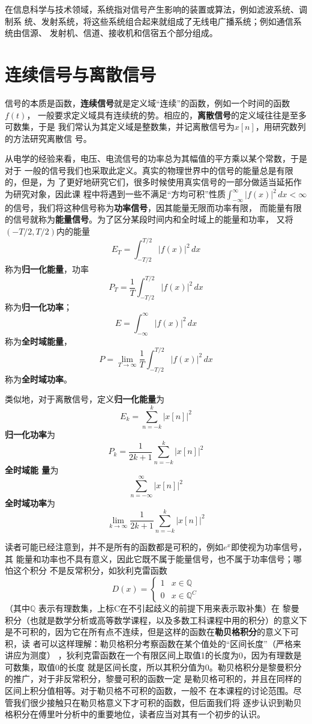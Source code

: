 \documentclass{ctexbook}
\begin{document}
在信息科学与技术领域，系统指对信号产生影响的装置或算法，例如滤波系统、调制系
统、发射系统，将这些系统组合起来就组成了无线电广播系统；例如通信系统由信源、
发射机、信道、接收机和信宿五个部分组成。

\section{连续信号与离散信号}\label{sec:signal}
信号的本质是函数，\textbf{连续信号}就是定义域“连续”的函数，例如一个时间的函数$f(t)$，
一般要求定义域具有连续统的势。相应的，\textbf{离散信号}的定义域往往是至多可数集，于是
我们常认为其定义域是整数集，并记离散信号为$x[n]$，用研究数列的方法研究离散信
号。

从电学的经验来看，电压、电流信号的功率总为其幅值的平方乘以某个常数，于是对于
一般的信号我们也采取此定义。真实的物理世界中的信号的能量总是有限的，但是，为
了更好地研究它们，很多时候使用真实信号的一部分做适当延拓作为研究对象，因此课
程中将遇到一些不满足“方均可积”性质$\int_{-\infty}^{\infty}| f(x)| ^2\,dx
    <\infty$的信号，我们将这种信号称为\textbf{功率信号}，因其能量无限而功率有限，
而能量有限的信号就称为\textbf{能量信号}。为了区分某段时间内和全时域上的能量和功率，
又将$(-T/2,T/2)$内的能量
\[E_T=\int_{-T/2}^{T/2}| f(x)| ^2\,dx\]
称为\textbf{归一化能量}，功率
\[P_T=\frac{1}{T}\int_{-T/2}^{T/2}| f(x)| ^2\,dx\]
称为\textbf{归一化功率}；
\[E=\int_{-\infty}^{\infty}| f(x)| ^2\,dx\]称为\textbf{全时域能量}，
\[P=\lim_{T \to \infty}  \frac{1}{T}\int_{-T/2}^{T/2}| f(x)| ^2\,dx\]
称为\textbf{全时域功率}。

类似地，对于离散信号，定义\textbf{归一化能量}为\[E_k=\sum_{n = -k}^{k}  |x[n]|^2\]
\textbf{归一化功率}为\[P_k=\frac{1}{2k+1}\sum_{n = -k}^{k}  |x[n]|^2\]\textbf{全时域能
    量}为\[\sum_{n = -\infty}^{\infty}  |x[n]|^2\]\textbf{全时域功率}为
\[\lim_{k \to \infty}  \frac{1}{2k+1}\sum_{n = -k}^{k}  |x[n]|^2\]

读者可能已经注意到，并不是所有的函数都是可积的，例如$e^x$即使视为功率信号，其
能量和功率也不具有意义，因此它既不属于能量信号，也不属于功率信号；哪怕这个积分
不是反常积分，如狄利克雷函数
\[D(x)=
    \begin{cases}
        1 & x \in \mathbb{Q}    \\
        0 & x \in \mathbb{Q} ^C
    \end{cases}\]
（其中$\mathbb{Q}$ 表示有理数集，上标C在不引起歧义的前提下用来表示取补集）在
黎曼积分（也就是数学分析或高等数学课程，以及多数工科课程中用的积分）的意义下
是不可积的，因为它在所有点不连续，但是这样的函数在\textbf{勒贝格积分}的意义下可积，读
者可以这样理解：勒贝格积分考察函数在某个值处的“区间长度”（严格来讲应为测度）
，狄利克雷函数在一个有限区间上取值1的长度为0，因为有理数是可数集，取值0的长度
就是区间长度，所以其积分值为0。勒贝格积分是黎曼积分的推广，对于非反常积分，黎曼可积的函数一定
是勒贝格可积的，并且在同样的区间上积分值相等。对于勒贝格不可积的函数，一般不
在本课程的讨论范围。尽管我们很少接触只在勒贝格意义下才可积的函数，但后面我们将
逐步认识到勒贝格积分在傅里叶分析中的重要地位，读者应当对其有一个初步的认识。
\end{document}
